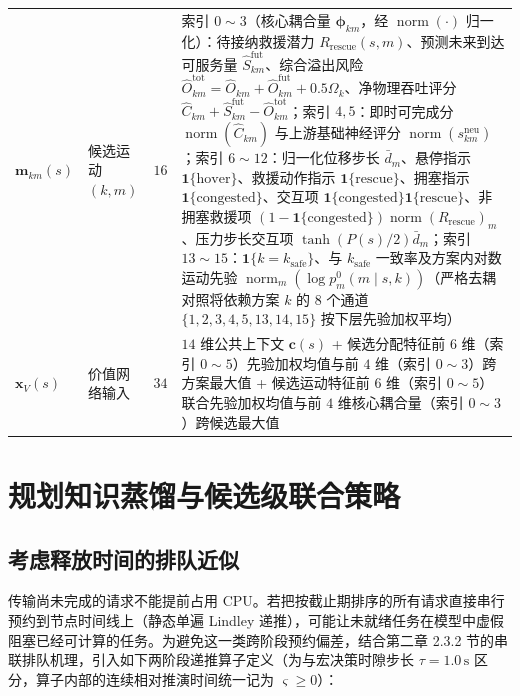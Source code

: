 \begin{table}[!htbp]
\begin{tabularx}{\textwidth}{llc>{\raggedright\arraybackslash}X}
$\mathbf m_{km}(s)$ & 候选运动 $(k,m)$ & $16$ & 索引 $0\sim 3$（核心耦合量 $\boldsymbol\phi_{km}$，经 $\operatorname{norm}(\cdot)$ 归一化）：待接纳救援潜力 $R_{\mathrm{rescue}}(s,m)$、预测未来到达可服务量 $\widehat S_{km}^{\mathrm{fut}}$、综合溢出风险 $\widehat O_{km}^{\mathrm{tot}}=\widehat O_{km}+\widehat O_{km}^{\mathrm{fut}}+0.5\Omega_k$、净物理吞吐评分 $\widehat C_{km}+\widehat S_{km}^{\mathrm{fut}}-\widehat O_{km}^{\mathrm{tot}}$；索引 $4,5$：即时可完成分 $\operatorname{norm}(\widehat C_{km})$ 与上游基础神经评分 $\operatorname{norm}(s_{km}^{\mathrm{neu}})$；索引 $6\sim 12$：归一化位移步长 $\bar d_m$、悬停指示 $\mathbf 1\{\mathrm{hover}\}$、救援动作指示 $\mathbf 1\{\mathrm{rescue}\}$、拥塞指示 $\mathbf 1\{\mathrm{congested}\}$、交互项 $\mathbf 1\{\mathrm{congested}\}\mathbf 1\{\mathrm{rescue}\}$、非拥塞救援项 $(1-\mathbf 1\{\mathrm{congested}\})\operatorname{norm}(R_{\mathrm{rescue}})_m$、压力步长交互项 $\tanh(P(s)/2)\bar d_m$；索引 $13\sim 15$：$\mathbf 1\{k=k_{\mathrm{safe}}\}$、与 $k_{\mathrm{safe}}$ 一致率及方案内对数运动先验 $\operatorname{norm}_m(\log p_m^0(m\mid s,k))$（严格去耦对照将依赖方案 $k$ 的 $8$ 个通道 $\{1,2,3,4,5,13,14,15\}$ 按下层先验加权平均） \\
$\mathbf x_V(s)$ & 价值网络输入 & $34$ & $14$ 维公共上下文 $\mathbf c(s)$ + 候选分配特征前 $6$ 维（索引 $0\sim 5$）先验加权均值与前 $4$ 维（索引 $0\sim 3$）跨方案最大值 + 候选运动特征前 $6$ 维（索引 $0\sim 5$）联合先验加权均值与前 $4$ 维核心耦合量（索引 $0\sim 3$）跨候选最大值 \\
\bottomrule
\end{tabularx}
\end{table}

\section{规划知识蒸馏与候选级联合策略}
\label{sec:ch5-distillation}

\subsection{考虑释放时间的排队近似}

传输尚未完成的请求不能提前占用 CPU。若把按截止期排序的所有请求直接串行预约到节点时间线上（静态单遍 Lindley 递推），可能让未就绪任务在模型中虚假阻塞已经可计算的任务。为避免这一类跨阶段预约偏差，结合第二章 2.3.2 节的串联排队机理，引入如下两阶段递推算子定义（为与宏决策时隙步长 $\tau=1.0\,\mathrm{s}$ 区分，算子内部的连续相对推演时间统一记为 $\varsigma\geq 0$）：

